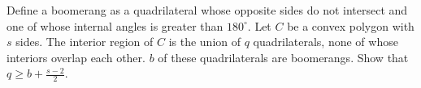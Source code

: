 Define a boomerang as a quadrilateral whose opposite sides do not intersect and one of whose internal angles is greater than $180^{\circ}$. Let $C$ be a convex polygon with $s$ sides. The interior region of $C$ is the union of $q$ quadrilaterals, none of whose interiors overlap each other. $b$ of these quadrilaterals are boomerangs. Show that $q\ge b+\frac{s-2}{2}$.